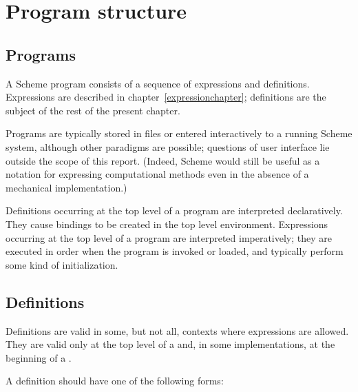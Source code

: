 \chapter{Program structure}
\label{programchapter}

\section{Programs}

A Scheme program consists of a sequence of expressions and definitions.
Expressions are described in chapter~\ref{expressionchapter};
definitions are the subject of the rest of the present chapter.

Programs are typically stored in files or entered interactively to a
running Scheme system, although other paradigms are possible;
questions of user interface lie outside the scope of this report.
(Indeed, Scheme would still be useful as a notation for expressing
computational methods even in the absence of a mechanical
implementation.)

Definitions occurring at the top level of a program are interpreted
declaratively.  They cause bindings to be created in the top level
environment.  Expressions occurring at the top level of a program are
interpreted imperatively; they are executed in order when the program is
invoked or loaded, and typically perform some kind of initialization.



\section{Definitions}

Definitions are valid in some, but not all, contexts where expressions
are allowed.  They are valid only at the top level of a 
and, in some implementations, at the beginning of a .

A definition should have one of the following forms:


